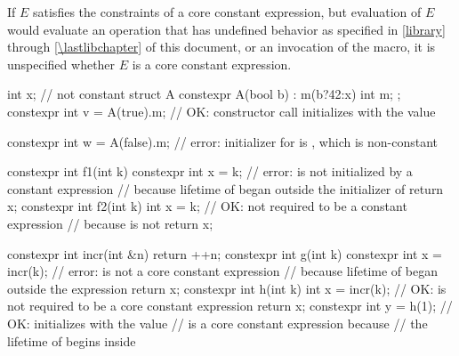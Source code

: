 If $E$ satisfies the constraints of a core constant expression, but
evaluation of $E$ would evaluate an operation that has undefined behavior
as specified in \ref{library} through \ref{\lastlibchapter} of this document, or
an invocation of the  macro,
it is unspecified whether $E$ is a core constant expression.

\begin{example}
\begin{codeblock}
int x;                              // not constant
struct A {
  constexpr A(bool b) : m(b?42:x) { }
  int m;
};
constexpr int v = A(true).m;        // OK: constructor call initializes  with the value 

constexpr int w = A(false).m;       // error: initializer for  is , which is non-constant

constexpr int f1(int k) {
  constexpr int x = k;              // error:  is not initialized by a constant expression
                                    // because lifetime of  began outside the initializer of 
  return x;
}
constexpr int f2(int k) {
  int x = k;                        // OK: not required to be a constant expression
                                    // because  is not 
  return x;
}

constexpr int incr(int &n) {
  return ++n;
}
constexpr int g(int k) {
  constexpr int x = incr(k);        // error:  is not a core constant expression
                                    // because lifetime of  began outside the expression 
  return x;
}
constexpr int h(int k) {
  int x = incr(k);                  // OK:  is not required to be a core constant expression
  return x;
}
constexpr int y = h(1);             // OK: initializes  with the value 
                                    //  is a core constant expression because
                                    // the lifetime of  begins inside 
\end{codeblock}
\end{example}

